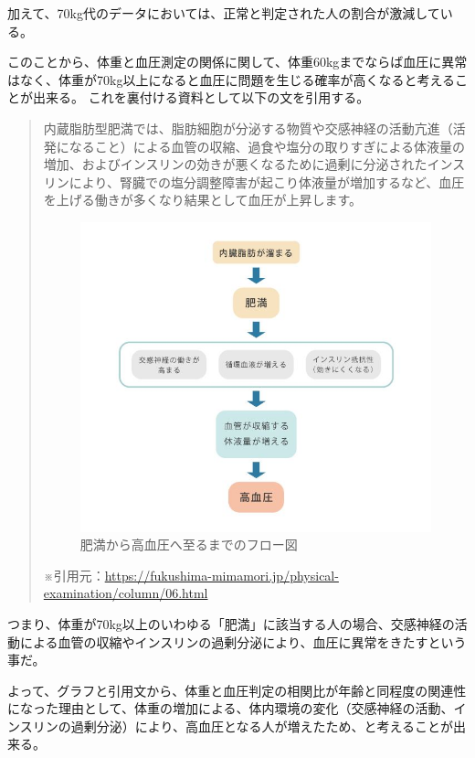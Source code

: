 \documentclass[dvipdfmx]{jsarticle}
\begin{document}
        加えて、70kg代のデータにおいては、正常と判定された人の割合が激減している。\par 
        このことから、体重と血圧測定の関係に関して、体重60kgまでならば血圧に異常はなく、体重が70kg以上になると血圧に問題を生じる確率が高くなると考えることが出来る。
        これを裏付ける資料として以下の文を引用する。
        \begin{quote}
            内蔵脂肪型肥満では、脂肪細胞が分泌する物質や交感神経の活動亢進（活発になること）による血管の収縮、過食や塩分の取りすぎによる体液量の増加、およびインスリンの効きが悪くなるために過剰に分泌されたインスリンにより、腎臓での塩分調整障害が起こり体液量が増加するなど、血圧を上げる働きが多くなり結果として血圧が上昇します。
            \begin{figure}[H]
                \centering
                \includegraphics[scale=0.5]{images/allgender/cap2.JPG}
                \caption{肥満から高血圧へ至るまでのフロー図}
            \end{figure}
            ※引用元：\url{https://fukushima-mimamori.jp/physical-examination/column/06.html}
        \end{quote}
        つまり、体重が70kg以上のいわゆる「肥満」に該当する人の場合、交感神経の活動による血管の収縮やインスリンの過剰分泌により、血圧に異常をきたすという事だ。\par 
        よって、グラフと引用文から、体重と血圧判定の相関比が年齢と同程度の関連性になった理由として、体重の増加による、体内環境の変化（交感神経の活動、インスリンの過剰分泌）により、高血圧となる人が増えたため、と考えることが出来る。
\end{document}
